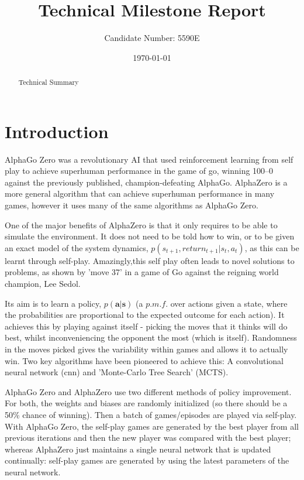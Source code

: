 \documentclass[a4paper]{article}
\author{Candidate Number: 5590E}
\title{Technical Milestone Report}
\date{\today}
\begin{document}
%

\maketitle

\renewcommand{\abstractname}{Summary}
\begin{abstract}
Technical Summary
\end{abstract}


\section{Introduction}

AlphaGo Zero was a revolutionary AI that used reinforcement learning from self play to achieve superhuman performance in the game of go, winning 100–0 against the previously published, champion-defeating AlphaGo. AlphaZero is a more general algorithm that can achieve superhuman performance in many games, however it uses many of the same algorithms as AlphaGo Zero.

One of the major benefits of AlphaZero is that it only requires to be able to simulate the environment. It does not need to be told how to win, or to be given an exact model of the system dynamics, $p(s_{t+1}, return_{t+1} |s_t, a_t)$, as this can be learnt through self-play. Amazingly,this self play often leads to novel solutions to problems, as shown by 'move 37' in a game of Go against the reigning world champion, Lee Sedol.

Its aim is to learn a policy, $p(\boldsymbol{a}|\boldsymbol{s})$ (a $p.m.f.$ over actions given a state, where the probabilities are proportional to the expected outcome for each action). It achieves this by playing against itself - picking the moves that it thinks will do best, whilst inconveniencing the opponent the most (which is itself). Randomness in the moves picked gives the variability within games and allows it to actually win. Two key algorithms have been pioneered to achieve this: A convolutional neural network (cnn) and 'Monte-Carlo Tree Search' (MCTS).

AlphaGo Zero and AlphaZero use two different methods of policy improvement. For both, the weights and biases are randomly initialized (so there should be a 50\% chance of winning). Then a batch of games/episodes are played via self-play. With AlphaGo Zero, the self-play games are generated by the best player from all previous iterations and then the new player was compared with the best player; whereas AlphaZero just maintains a single neural network that is updated continually: self-play games are generated by using the latest parameters of the neural network. \cite{AlphaZero}
\end{document}

